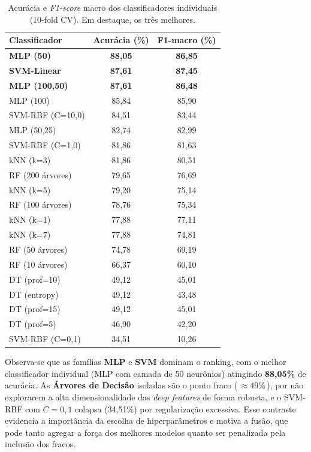 \documentclass[12pt]{article}
\begin{document}
\begin{table}[H]
\centering
\caption{Acurácia e \textit{F1-score} macro dos classificadores individuais
(10-fold CV). Em destaque, os três melhores.}
\label{tab:ind}
\begin{tabular}{lcc}
\toprule
Classificador & Acurácia (\%) & F1-macro (\%) \\
\midrule
\textbf{MLP (50)}      & \textbf{88,05} & \textbf{86,85} \\
\textbf{SVM-Linear}    & \textbf{87,61} & \textbf{87,45} \\
\textbf{MLP (100,50)}  & \textbf{87,61} & \textbf{86,48} \\
MLP (100)              & 85,84 & 85,90 \\
SVM-RBF (C=10,0)       & 84,51 & 83,44 \\
MLP (50,25)            & 82,74 & 82,99 \\
SVM-RBF (C=1,0)        & 81,86 & 81,63 \\
kNN (k=3)              & 81,86 & 80,51 \\
RF (200 árvores)       & 79,65 & 76,69 \\
kNN (k=5)              & 79,20 & 75,14 \\
RF (100 árvores)       & 78,76 & 75,34 \\
kNN (k=1)              & 77,88 & 77,11 \\
kNN (k=7)              & 77,88 & 74,81 \\
RF (50 árvores)        & 74,78 & 69,19 \\
RF (10 árvores)        & 66,37 & 60,10 \\
DT (prof=10)           & 49,12 & 45,01 \\
DT (entropy)           & 49,12 & 43,48 \\
DT (prof=15)           & 49,12 & 45,01 \\
DT (prof=5)            & 46,90 & 42,20 \\
SVM-RBF (C=0,1)        & 34,51 & 10,26 \\
\bottomrule
\end{tabular}
\end{table}

Observa-se que as famílias \textbf{MLP} e \textbf{SVM} dominam o ranking, com o
melhor classificador individual (MLP com camada de 50 neurônios) atingindo
\textbf{88,05\%} de acurácia. As \textbf{Árvores de Decisão} isoladas são o ponto
fraco (\,$\approx$49\%\,), por não explorarem a alta dimensionalidade das
\textit{deep features} de forma robusta, e o SVM-RBF com $C=0{,}1$ colapsa
(34,51\%) por regularização excessiva. Esse contraste evidencia a importância da
escolha de hiperparâmetros e motiva a fusão, que pode tanto agregar a força dos
melhores modelos quanto ser penalizada pela inclusão dos fracos.
\end{document}
